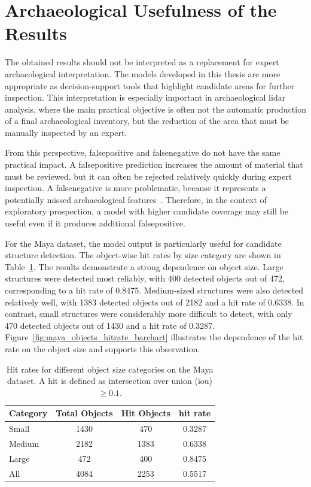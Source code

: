 \section{Archaeological Usefulness of the Results}

The obtained results should not be interpreted as a replacement for expert archaeological interpretation. The models developed in this thesis are more appropriate as decision-support tools that highlight candidate areas for further inspection. This interpretation is especially important in archaeological \gls{lidar} analysis, where the main practical objective is often not the automatic production of a final archaeological inventory, but the reduction of the area that must be manually inspected by an expert.

From this perspective, \gls{falsepositive} and \gls{falsenegative} do not have the same practical impact. A \gls{falsepositive} prediction increases the amount of material that must be reviewed, but it can often be rejected relatively quickly during expert inspection. A \gls{falsenegative} is more problematic, because it represents a potentially missed archaeological features~\cite{guyot_combined_2021,verschoof-van_der_vaart_combining_2020,somrak_learning_2020}. Therefore, in the context of exploratory prospection, a model with higher candidate coverage may still be useful even if it produces additional \gls{falsepositive}.

For the Maya dataset, the model output is particularly useful for candidate structure detection. The object-wise hit rates by size category are shown in Table~\ref{tab:maya_hit_rate_by_size}. The results demonstrate a strong dependence on object size. Large structures were detected most reliably, with 400 detected objects out of 472, corresponding to a hit rate of 0.8475. Medium-sized structures were also detected relatively well, with 1383 detected objects out of 2182 and a hit rate of 0.6338. In contrast, small structures were considerably more difficult to detect, with only 470 detected objects out of 1430 and a hit rate of 0.3287. Figure~\ref{fig:maya_objects_hitrate_barchart} illustrates the dependence of the hit rate on the object size and supports this observation.

\begin{table}[H]
    \centering
    \caption{Hit rates for different object size categories on the Maya dataset. A hit is defined as intersection over union (\gls{iou}) $\geq 0.1$.}
    \label{tab:maya_hit_rate_by_size}
    \small
    \setlength{\tabcolsep}{6pt}
    \renewcommand{\arraystretch}{1.15}
    \begin{tabular}{lccc}
        \toprule
        \textbf{Category} & \textbf{Total Objects} & \textbf{Hit Objects} & \textbf{hit rate} \\
        \midrule
        Small  & 1430 & 470  & 0.3287 \\
        Medium & 2182 & 1383 & 0.6338 \\
        Large  & 472  & 400  & 0.8475 \\
        All    & 4084 & 2253 & 0.5517 \\
        \bottomrule
    \end{tabular}
\end{table}

